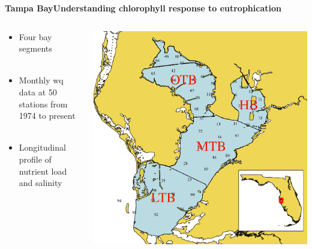 \documentclass[serif]{beamer}\usepackage[]{graphicx}\usepackage[]{color}
\begin{document}
\begin{frame}{\textbf{Tampa Bay}}{\textbf{Understanding chlorophyll response to eutrophication}}
\begin{columns}
\begin{column}{0.5\textwidth}
\begin{itemize}
\item Four bay segments\\~\\
\item Monthly wq data at 50 stations from 1974 to present \\~\\
\item Longitudinal profile of nutrient load and salinity \\~\\
\end{itemize}
\vspace{0cm}\hspace*{15pt}
\end{column}
\begin{column}{0.5\textwidth}
\centerline{\includegraphics[width = \textwidth]{fig/tb_map.pdf}}
\end{column}
\end{columns}
\end{frame}
\end{document}
